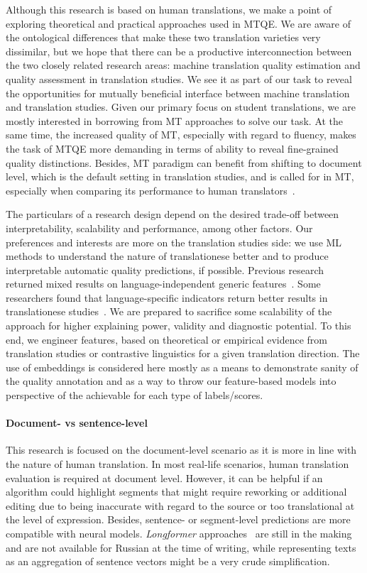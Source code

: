 Although this research is based on human translations, we make a point of exploring theoretical and practical approaches used in \gls*{MTQE}. We are aware of the ontological differences that make these two translation varieties very dissimilar, but we hope that there can be a productive interconnection between the two closely related research areas: machine translation quality estimation and quality assessment in translation studies. 
We see it as part of our task to reveal the opportunities for mutually beneficial interface between machine translation and translation studies. Given our primary focus on student translations, we are mostly interested in borrowing from MT approaches to solve our task. At the same time, the increased quality of MT, especially with regard to fluency, makes the task of MTQE more demanding in terms of ability to reveal fine-grained quality distinctions.
Besides, MT paradigm can benefit from shifting to document level, which is the default setting in translation studies, and is called for in MT, especially when comparing its performance to human translators~\citep{Laubli2018,Voita2019}.

The particulars of a research design depend on the desired trade-off between interpretability, scalability and performance, among other factors. Our preferences and interests are more on the translation studies side: we use ML methods to understand the nature of translationese better and to produce interpretable automatic quality predictions, if possible. Previous research returned mixed results on language-independent generic features~\citep{Sutter2017,Kunilovskaya2021lit}. Some researchers found that language-specific indicators return better results in translationese studies~\citep{Hu2021}. We are prepared to sacrifice some scalability of the approach for higher explaining power, validity and diagnostic potential. To this end, we engineer features, based on theoretical or empirical evidence from translation studies or contrastive linguistics for a given translation direction. The use of embeddings is considered here mostly as a means to demonstrate sanity of the quality annotation and as a way to throw our feature-based models into perspective of the achievable for each type of labels/scores. 

\paragraph{Document- vs sentence-level} This research is focused on the document-level scenario as it is more in line with the nature of human translation. In most real-life scenarios, human translation evaluation is required at document level. However, it can be helpful if an algorithm could highlight segments that might require reworking or additional editing due to being inaccurate with regard to the source or too translational at the level of expression. Besides, sentence- or segment-level predictions are more compatible with neural models. \textit{Longformer} approaches~\cite{Beltagy2020} are still in the making and are not available for Russian at the time of writing, while representing texts as an aggregation of sentence vectors might be a very crude simplification.

